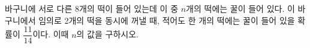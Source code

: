 바구니에 서로 다른 8개의 떡이 들어 있는데 이 중 $n$개의 떡에는 꿀이 들어 있다. 이 바구니에서 임의로 2개의 떡을 동시에 꺼낼 때, 적어도 한 개의 떡에는 꿀이 들어 있을 확률이 $\dfrac{11}{14}$이다. 이때 $n$의 값을 구하시오. 

